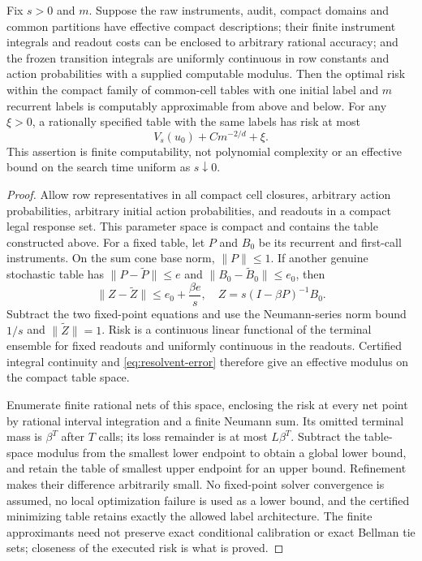 \begin{proposition}\label{prop:effective}
Fix $s>0$ and $m$. Suppose the raw instruments, audit, compact domains and common partitions have effective compact descriptions; their finite instrument integrals and readout costs can be enclosed to arbitrary rational accuracy; and the frozen transition integrals are uniformly continuous in row constants and action probabilities with a supplied computable modulus. Then the optimal risk within the compact family of common-cell tables with one initial label and $m$ recurrent labels is computably approximable from above and below. For any $\xi>0$, a rationally specified table with the same labels has risk at most
\[
 V_s(u_0)+Cm^{-2/d}+\xi.
\]
This assertion is finite computability, not polynomial complexity or an effective bound on the search time uniform as $s\downarrow0$.
\end{proposition}
\begin{proof}
Allow row representatives in all compact cell closures, arbitrary action probabilities, arbitrary initial action probabilities, and readouts in a compact legal response set. This parameter space is compact and contains the table constructed above. For a fixed table, let $P$ and $B_0$ be its recurrent and first-call instruments. On the sum cone base norm, $\|P\|\le1$. If another genuine stochastic table has $\|P-\widetilde P\|\le e$ and $\|B_0-\widetilde B_0\|\le e_0$, then
\begin{equation}\label{eq:resolvent-error}
 \|Z-\widetilde Z\|
 \le e_0+\frac{\beta e}{s},
 \quad Z=s(I-\beta P)^{-1}B_0.
\end{equation}
Subtract the two fixed-point equations and use the Neumann-series norm bound $1/s$ and $\|\widetilde Z\|=1$. Risk is a continuous linear functional of the terminal ensemble for fixed readouts and uniformly continuous in the readouts. Certified integral continuity and \eqref{eq:resolvent-error} therefore give an effective modulus on the compact table space.

Enumerate finite rational nets of this space, enclosing the risk at every net point by rational interval integration and a finite Neumann sum. Its omitted terminal mass is $\beta^{T}$ after $T$ calls; its loss remainder is at most $L\beta^{T}$. Subtract the table-space modulus from the smallest lower endpoint to obtain a global lower bound, and retain the table of smallest upper endpoint for an upper bound. Refinement makes their difference arbitrarily small. No fixed-point solver convergence is assumed, no local optimization failure is used as a lower bound, and the certified minimizing table retains exactly the allowed label architecture. The finite approximants need not preserve exact conditional calibration or exact Bellman tie sets; closeness of the executed risk is what is proved.
\end{proof}


